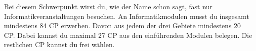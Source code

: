 Bei diesem Schwerpunkt wirst du, wie der Name schon sagt, fast nur Informatikveranstaltungen besuchen. An Informatikmodulen musst du insgesamt mindestens 84 CP erwerben. Davon aus jedem der drei Gebiete mindestens 20 CP. Dabei kannst du maximal 27 CP aus den einführenden Modulen belegen. Die restlichen CP kannst du frei wählen.